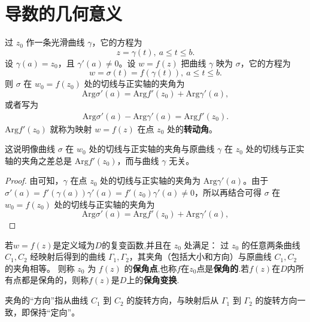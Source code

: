 \documentclass[../../main.tex]{subfiles}%
\begin{document}
\section{导数的几何意义}

\begin{proposition}
过 \( z_0 \) 作一条光滑曲线 \( \gamma \)，它的方程为  
\[ z = \gamma(t),\ a \leqslant t \leqslant b. \]  
设 \( \gamma(a) = z_0 \)，且 \( \gamma'(a) \neq 0 \)。设 \( w = f(z) \) 把曲线 \( \gamma \) 映为 \( \sigma \)，它的方程为  
\[ w = \sigma(t) = f(\gamma(t)),\ a \leqslant t \leqslant b. \]  
则 \( \sigma \) 在 \( w_0 = f(z_0) \) 处的切线与正实轴的夹角为  
\[ \mathrm{Arg}\sigma'(a) = \mathrm{Arg} f'(z_0) + \mathrm{Arg} \gamma'(a), \]  
或者写为  
\begin{align}
\mathrm{Arg} \sigma'(a) - \mathrm{Arg} \gamma'(a) = \mathrm{Arg} f'(z_0). \label{equation----:::2.1}
\end{align}
\( \mathrm{Arg} f'(z_0) \) 就称为映射 \( w = f(z) \) 在点 \( z_0 \) 处的\textbf{转动角}。
\end{proposition}
\begin{note}
这说明像曲线 \( \sigma \) 在 \( w_0 \) 处的切线与正实轴的夹角与原曲线 \( \gamma \) 在 \( z_0 \) 处的切线与正实轴的夹角之差总是 \( \mathrm{Arg} f'(z_0) \)，而与曲线 \( \gamma \) 无关。
\end{note}
\begin{proof}

由可知，\( \gamma \) 在点 \( z_0 \) 处的切线与正实轴的夹角为 \( \mathrm{Arg} \gamma'(a) \)。由于 \( \sigma'(a) = f'(\gamma(a))\gamma'(a) = f'(z_0)\gamma'(a) \neq 0 \)，所以再结合可得 \( \sigma \) 在 \( w_0 = f(z_0) \) 处的切线与正实轴的夹角为  
\[ \mathrm{Arg}\sigma'(a) = \mathrm{Arg} f'(z_0) + \mathrm{Arg} \gamma'(a), \]  

\end{proof}

\begin{definition}
若\( w = f(z) \)是定义域为$D$的复变函数,并且在 \( z_0 \) 处满足：  
过 \( z_0 \) 的任意两条曲线 \( C_1, C_2 \) 经映射后得到的曲线 \( \Gamma_1, \Gamma_2 \)，其夹角（包括大小和方向）与原曲线 \( C_1, C_2 \) 的夹角相等。  
则称 \( z_0 \) 为 \( f(z) \) 的\textbf{保角点},也称$f$在$z_0$点是\textbf{保角的}.若\(f(z)\)在$D$内所有点都是保角的，则称\(f(z)\)是$D$上的\textbf{保角变换}.
\end{definition}
\begin{remark}
夹角的“方向”指从曲线 \( C_1 \) 到 \( C_2 \) 的旋转方向，与映射后从 \( \Gamma_1 \) 到 \( \Gamma_2 \) 的旋转方向一致，即保持“定向”。
\end{remark}
\end{document}
